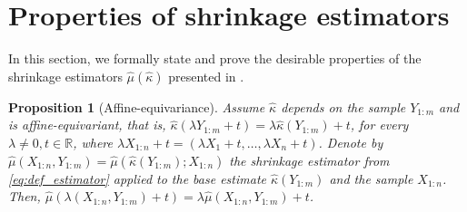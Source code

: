 \documentclass{article}
\theoremstyle{plain}
\newtheorem{proposition}[theorem]{Proposition}
\theoremstyle{definition}
\def\R{\mathbb{R}} %
\begin{document}
\section{Properties of shrinkage estimators}\label{sec:properties}
In this section, we formally state and prove the desirable properties of the shrinkage estimators \( \widehat{\mu}(\widehat{\kappa } )  \) presented in .
\begin{proposition}[Affine-equivariance]
		Assume \( \widehat{\kappa} \) depends on the sample \( Y_{1:m} \) and is affine-equivariant, that is, \( \widehat{\kappa }(\lambda Y_{1:m}+t )= \lambda \widehat{\kappa }(Y_{1:m})+t \), for every \( \lambda \neq 0, t \in
    \R\), where \( \lambda X_{1:n}+t = (\lambda X_1+t,\ldots, \lambda X_n +t ) \). Denote by \( \widehat{\mu }(X_{1:n},Y_{1:m})=\widehat{\mu }(\widehat{\kappa }(Y_{1:m}); X_{1:n} )  \) the shrinkage estimator from \eqref{eq:def_estimator} applied to the base estimate \( \widehat{\kappa }(Y_{1:m}) \) and the sample \( X_{1:n} \). Then, \( \widehat{\mu }(\lambda (X_{1:n},Y_{1:m})+t)=\lambda \widehat{\mu }(X_{1:n},Y_{1:m})+t \).
	\end{proposition}
\end{document}

